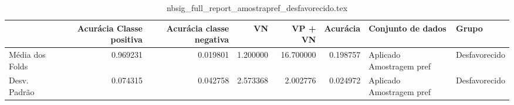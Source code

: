 \begin{table}
\centering
\caption{nbsig_full_report_amostrapref_desfavorecido.tex}
\label{nbsig_full_report_amostrapref_desfavorecido.tex}
\begin{tabular}{lrrrrrll}
\toprule
{} &  Acurácia Classe positiva &  Acurácia classe negativa &       VN  &   VP + VN  &  Acurácia &         Conjunto de dados &          Grupo \\
\midrule
Média dos Folds &                  0.969231 &                  0.019801 &  1.200000 &  16.700000 &  0.198757 &  Aplicado Amostragem pref &  Desfavorecido \\
Desv. Padrão    &                  0.074315 &                  0.042758 &  2.573368 &   2.002776 &  0.024972 &  Aplicado Amostragem pref &  Desfavorecido \\
\bottomrule
\end{tabular}
\end{table}
